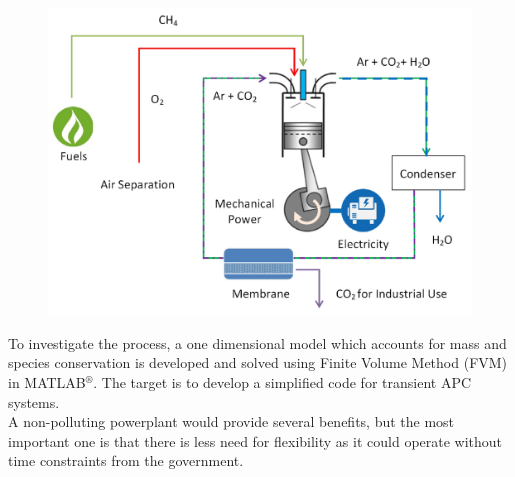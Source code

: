 \begin{figure}[H]
	\centering
	\includegraphics[width= 1\textwidth]{Images/fig8.png}
	\label{fig:fig8}
\end{figure}

To investigate the process, a one dimensional model which accounts for mass and species conservation is developed and solved using Finite Volume Method (FVM) in MATLAB$^\circledR$. The target is to develop a simplified code for transient APC systems. \\

A non-polluting powerplant would provide several benefits, but the most important one is that there is less need for flexibility as it could operate without time constraints from the government. 